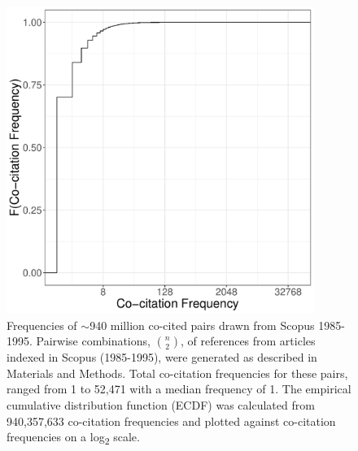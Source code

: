 \documentclass[utf8]{frontiersSCNS}
\begin{document}

\begin{figure}[h!]
\begin{center}
\includegraphics[width=10cm]{fig1}%
\end{center}
\caption{Frequencies of $\sim$940 million co-cited pairs drawn from Scopus 1985-1995. Pairwise combinations, $n\choose 2$, of references from articles indexed in Scopus (1985-1995), were generated as described in Materials and Methods. Total co-citation frequencies for these pairs, ranged from 1 to 52,471 with a median frequency of 1. The empirical cumulative distribution function (ECDF) was calculated from 940,357,633 co-citation frequencies and plotted against co-citation frequencies on a log\textsubscript{2} scale.}
\label{fig:fig1}
\end{figure}
\end{document}
